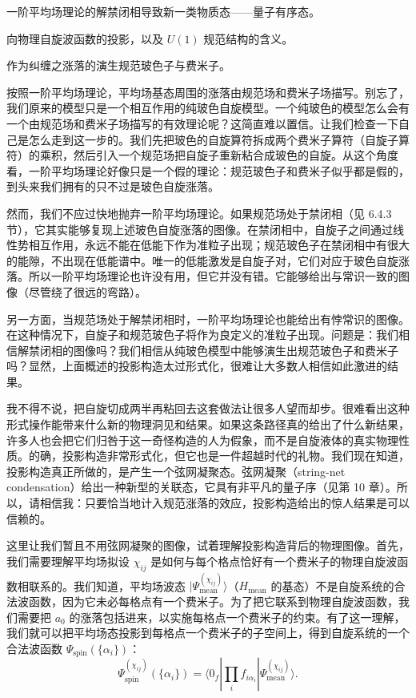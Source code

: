 \begin{keypoints}
\item 一阶平均场理论的解禁闭相导致新一类物质态——量子有序态。
\item 向物理自旋波函数的投影，以及 $U(1)$ 规范结构的含义。
\item 作为纠缠之涨落的演生规范玻色子与费米子。
\end{keypoints}

按照一阶平均场理论，平均场基态周围的涨落由规范场和费米子场描写。别忘了，我们原来的模型只是一个相互作用的纯玻色自旋模型。一个纯玻色的模型怎么会有一个由规范场和费米子场描写的有效理论呢？这简直难以置信。让我们检查一下自己是怎么走到这一步的。我们先把玻色的自旋算符拆成两个费米子算符（自旋子算符）的乘积，然后引入一个规范场把自旋子重新粘合成玻色的自旋。从这个角度看，一阶平均场理论好像只是一个假的理论：规范玻色子和费米子似乎都是假的，到头来我们拥有的只不过是玻色自旋涨落。

然而，我们不应过快地抛弃一阶平均场理论。如果规范场处于禁闭相（见 6.4.3 节），它其实能够复现上述玻色自旋涨落的图像。在禁闭相中，自旋子之间通过线性势相互作用，永远不能在低能下作为准粒子出现；规范玻色子在禁闭相中有很大的能隙，不出现在低能谱中。唯一的低能激发是自旋子对，它们对应于玻色自旋涨落。所以一阶平均场理论也许没有用，但它并没有错。它能够给出与常识一致的图像（尽管绕了很远的弯路）。

另一方面，当规范场处于解禁闭相时，一阶平均场理论也能给出有悖常识的图像。在这种情况下，自旋子和规范玻色子将作为良定义的准粒子出现。问题是：我们相信解禁闭相的图像吗？我们相信从纯玻色模型中能够演生出规范玻色子和费米子吗？显然，上面概述的投影构造太过形式化，很难让大多数人相信如此激进的结果。

我不得不说，把自旋切成两半再粘回去这套做法让很多人望而却步。很难看出这种形式操作能带来什么新的物理洞见和结果。如果这条路径真的给出了什么新结果，许多人也会把它们归咎于这一奇怪构造的人为假象，而不是自旋液体的真实物理性质。的确，投影构造非常形式化，但它也是一件超越时代的礼物。我们现在知道，投影构造真正所做的，是产生一个弦网凝聚态。弦网凝聚（string-net condensation）给出一种新型的关联态，它具有非平凡的量子序（见第 10 章）。所以，请相信我：只要恰当地计入规范涨落的效应，投影构造给出的惊人结果是可以信赖的。

这里让我们暂且不用弦网凝聚的图像，试着理解投影构造背后的物理图像。首先，我们需要理解平均场拟设 $\chi_{ij}$ 是如何与每个格点恰好有一个费米子的物理自旋波函数相联系的。我们知道，平均场波态 $|\Psi^{(\chi_{ij})}_{\text{mean}}\rangle$（$H_{\text{mean}}$ 的基态）不是自旋系统的合法波函数，因为它未必每格点有一个费米子。为了把它联系到物理自旋波函数，我们需要把 $a_0$ 的涨落包括进来，以实施每格点一个费米子的约束。有了这一理解，我们就可以把平均场态投影到每格点一个费米子的子空间上，得到自旋系统的一个合法波函数 $\Psi_{\text{spin}}(\{\alpha_i\})$：
\begin{equation*}
\Psi^{(\chi_{ij})}_{\text{spin}}(\{\alpha_i\})=\langle 0_f|\prod_{i}f_{i\alpha_i}|\Psi^{(\chi_{ij})}_{\text{mean}}\rangle.
\tag{9.1.12}
\end{equation*}

